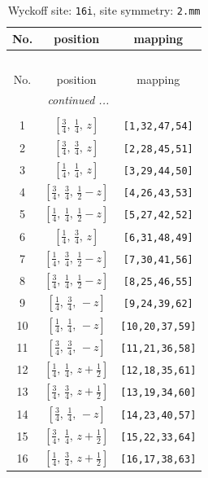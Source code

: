 \documentclass[fleqn,8pt]{jsarticle}
\begin{document}
\begin{longtable}{ccc}
\caption{Wyckoff site: {\tt 16i}, site symmetry: {\tt 2.mm}}
 \\
 \hline \hline
No. & position & mapping \\ \hline \endfirsthead

\multicolumn{2}{l}{\tablename\ \thetable{}} \\
 \hline \hline
No. & position & mapping \\ \hline \endhead

 \hline \hline
\multicolumn{2}{r}{\footnotesize\it continued ...} \\ \endfoot

 \hline \hline
\multicolumn{2}{r}{} \\ \endlastfoot

1 & $\left[ \frac{3}{4},\, \frac{1}{4},\, z \right]$ & {\tt [1,32,47,54]} \\ \hline
2 & $\left[ \frac{3}{4},\, \frac{3}{4},\, z \right]$ & {\tt [2,28,45,51]} \\ \hline
3 & $\left[ \frac{1}{4},\, \frac{1}{4},\, z \right]$ & {\tt [3,29,44,50]} \\ \hline
4 & $\left[ \frac{3}{4},\, \frac{3}{4},\, \frac{1}{2} - z \right]$ & {\tt [4,26,43,53]} \\ \hline
5 & $\left[ \frac{1}{4},\, \frac{1}{4},\, \frac{1}{2} - z \right]$ & {\tt [5,27,42,52]} \\ \hline
6 & $\left[ \frac{1}{4},\, \frac{3}{4},\, z \right]$ & {\tt [6,31,48,49]} \\ \hline
7 & $\left[ \frac{1}{4},\, \frac{3}{4},\, \frac{1}{2} - z \right]$ & {\tt [7,30,41,56]} \\ \hline
8 & $\left[ \frac{3}{4},\, \frac{1}{4},\, \frac{1}{2} - z \right]$ & {\tt [8,25,46,55]} \\ \hline
9 & $\left[ \frac{1}{4},\, \frac{3}{4},\, - z \right]$ & {\tt [9,24,39,62]} \\ \hline
10 & $\left[ \frac{1}{4},\, \frac{1}{4},\, - z \right]$ & {\tt [10,20,37,59]} \\ \hline
11 & $\left[ \frac{3}{4},\, \frac{3}{4},\, - z \right]$ & {\tt [11,21,36,58]} \\ \hline
12 & $\left[ \frac{1}{4},\, \frac{1}{4},\, z + \frac{1}{2} \right]$ & {\tt [12,18,35,61]} \\ \hline
13 & $\left[ \frac{3}{4},\, \frac{3}{4},\, z + \frac{1}{2} \right]$ & {\tt [13,19,34,60]} \\ \hline
14 & $\left[ \frac{3}{4},\, \frac{1}{4},\, - z \right]$ & {\tt [14,23,40,57]} \\ \hline
15 & $\left[ \frac{3}{4},\, \frac{1}{4},\, z + \frac{1}{2} \right]$ & {\tt [15,22,33,64]} \\ \hline
16 & $\left[ \frac{1}{4},\, \frac{3}{4},\, z + \frac{1}{2} \right]$ & {\tt [16,17,38,63]} \\
\end{longtable}
\end{document}
